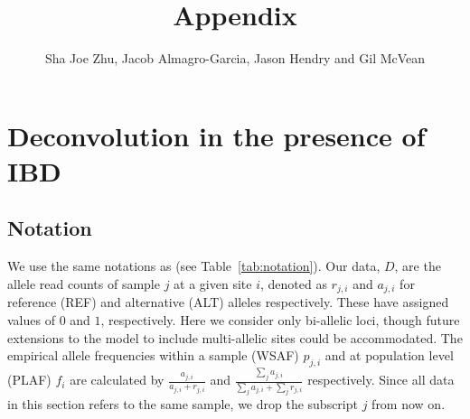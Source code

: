 \documentclass[9pt]{article}
\title{Appendix}
\author{Sha Joe Zhu, Jacob Almagro-Garcia, Jason Hendry and Gil McVean}
\date{}
\begin{document}
\listoftodos
\clearpage

\maketitle
\tableofcontents


\newpage

\section{Deconvolution in the presence of IBD}
\subsection{Notation}
We use the same notations as \citet{Zhu2017} (see Table~\ref{tab:notation}). Our data, $D$, are the allele read counts of sample $j$ at a given site $i$, denoted as $r_{j,i}$ and $a_{j,i}$ for reference (REF) and alternative (ALT) alleles respectively.  These have assigned values of $0$ and $1$, respectively. Here we consider only bi-allelic loci, though future extensions to the model to include multi-allelic sites could be accommodated.  The empirical allele frequencies within a sample (WSAF) $p_{j,i}$ and at population level (PLAF) $f_i$ are calculated by $ \frac{a_{j,i}}{a_{j,i} + r_{j,i}}$ and $ \frac{\sum_j a_{j,i}}{\sum_j a_{j,i} + \sum_j r_{j,i}}$ respectively. Since all data in this section refers to the same sample, we drop the subscript $j$ from now on.
\end{document}
